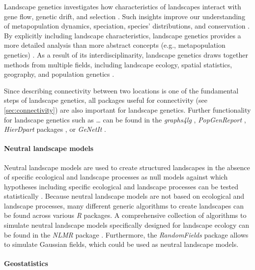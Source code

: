 \documentclass[smallextended]{svjour3}       %
\begin{document}
Landscape genetics investigates how characteristics of landscapes interact with gene flow, genetic drift, and selection \cite{Manel2003}.
Such insights improve our understanding of metapopulation dynamics, speciation, species' distributions, and conservation \cite{Storfer2007}.
By explicitly including landscape characteristics, landscape genetics provides a more detailed analysis than more abstract concepts (e.g., metapopulation genetics) \cite{Holderegger2006}.
As a result of its interdisciplinarity, landscape genetics draws together methods from multiple fields, including landscape ecology, spatial statistics, geography, and population genetics \cite{Storfer2007}.

Since describing connectivity between two locations is one of the fundamental steps of landscape genetics, all packages useful for connectivity (see \ref{sec:connectivity}) are also important for landscape genetics.
Further functionality for landscape genetics such as \ldots{} can be found in the \emph{graphs4lg} \cite{Savary2020}, \emph{PopGenReport} \cite{Adamack2014,Gruber2015}, \emph{HierDpart} packages \cite{Qin2019}, or \emph{GeNetIt} \cite{Murphy2010}.

\hypertarget{sec:NLM}{%
\paragraph{Neutral landscape models}\label{sec:NLM}}

Neutral landscape models are used to create structured landscapes in the absence of specific ecological and landscape processes as null models against which hypotheses including specific ecological and landscape processes can be tested statistically \cite{Gardner1987,With1997}.
Because neutral landscape models are not based on ecological and landscape processes, many different generic algorithms to create landscapes can be found across various \emph{R} packages.
A comprehensive collection of algorithms to simulate neutral landscape models specifically designed for landscape ecology can be found in the \emph{NLMR} package \cite{Sciaini2018}.
Furthermore, the \emph{RandomFields} package \cite{Schlather2015} allows to simulate Gaussian fields, which could be used as neutral landscape models.

\hypertarget{geostatistics}{%
\paragraph{Geostatistics}\label{geostatistics}}
\end{document}
